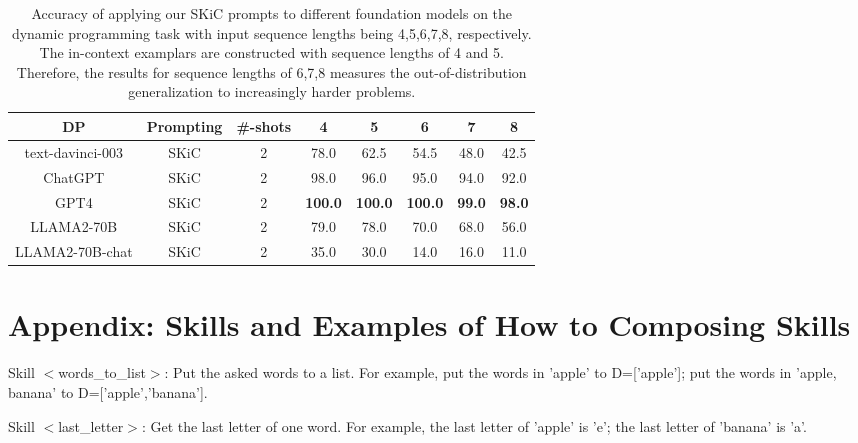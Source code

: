 \documentclass{article} %
\begin{document}
\begin{table}[ht]
\caption{Accuracy of applying our SKiC prompts to different foundation models on the dynamic programming task with input sequence lengths being 4,5,6,7,8, respectively. The in-context examplars are constructed with sequence lengths of 4 and 5. Therefore, the results for sequence lengths of 6,7,8 measures the out-of-distribution generalization to increasingly harder problems.} \label{Tab:dp_results_llama2}
\centering
\begin{tabular}{c|c|c|cc|ccc} \toprule
\textbf{DP}               & \textbf{Prompting}&\textbf{\#-shots} & \multicolumn{1}{c}{\textbf{4}} & \textbf{5}  & \textbf{6}  & \textbf{7}  & \textbf{8}  \\ \midrule\midrule 

\multirow{1}{*}{text-davinci-003}
                          & SKiC   &2             & 78.0                    & 62.5 & 54.5 & 48.0 &42.5 \\ 
\multirow{1}{*}{ChatGPT} 
                          & SKiC    &2            & 98.0                    & 96.0 & 95.0 & 94.0 & 92.0 \\ 
\multirow{1}{*}{GPT4}    
                          & SKiC  &2             & \textbf{100.0}                    & \textbf{100.0} & \textbf{100.0} & \textbf{99.0} & \textbf{98.0} \\ \midrule

\multirow{1}{*}{LLAMA2-70B}
                          & SKiC   &2             & 79.0                    & 78.0 & 70.0 & 68.0 &56.0 \\ 
\multirow{1}{*}{LLAMA2-70B-chat}
                          & SKiC   &2             & 35.0                    & 30.0 & 14.0 & 16.0 &11.0 \\  \bottomrule
\end{tabular} 
\end{table}



\newpage


\section{Appendix: Skills and Examples of How to Composing Skills}



\begin{tcolorbox}[title = {Skills for Last Letter Concatenation}, colback = Apricot!25!white, colframe = BrickRed!75!black] 
Skill $<$words\_to\_list$>$: Put the asked words to a list.  For example, put the words in 'apple' to D=['apple']; put the words in 'apple, banana' to  D=['apple','banana']. 

\quad

Skill $<$last\_letter$>$: Get the last letter of one word.  For example, the last letter of 'apple' is 'e'; the last letter of 'banana' is 'a'.
\end{tcolorbox}
\noindent\begin{minipage}{\textwidth}
 \label{Tab:last_letter_skill}
\end{minipage}
\end{document}
